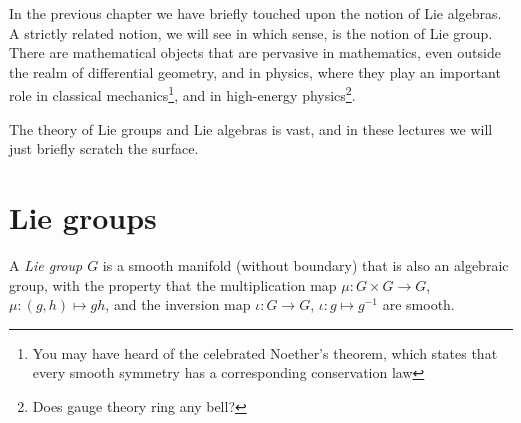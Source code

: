 In the previous chapter we have briefly touched upon the notion of Lie algebras.
A strictly related notion, we will see in which sense, is the notion of Lie group.
There are mathematical objects that are pervasive in mathematics, even outside the realm of differential geometry, and in physics, where they play an important role in classical mechanics\footnote{You may have heard of the celebrated Noether's theorem, which states that every smooth symmetry has a corresponding conservation law}, and in high-energy physics\footnote{Does gauge theory ring any bell?}.

The theory of Lie groups and Lie algebras is vast, and in these lectures we will just briefly scratch the surface.

\section{Lie groups}

\begin{definition}
  A \emph{Lie group $G$} is a smooth manifold (without boundary) that is also an algebraic group, with the property that the multiplication map $\mu: G\times G \to G$, $\mu:(g,h)\mapsto gh$, and the inversion map $\iota:G\to G$, $\iota: g\mapsto g^{-1}$ are smooth.
\end{definition}

